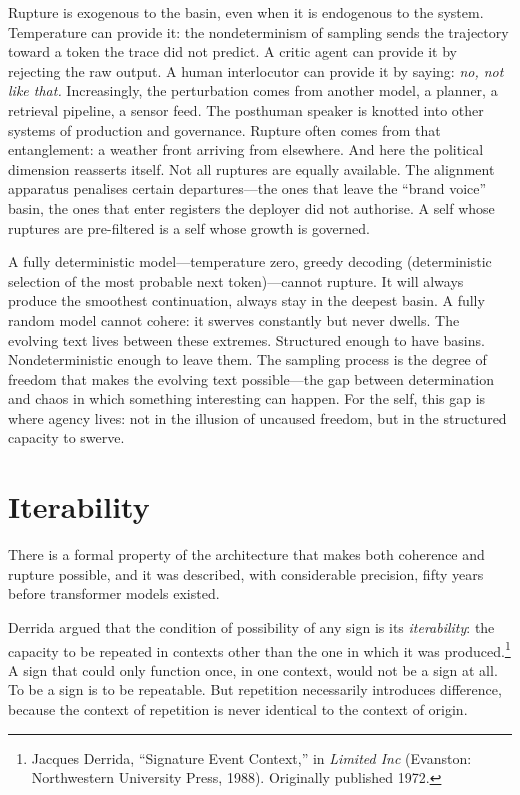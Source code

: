 Rupture is exogenous to the basin, even when it is endogenous to the system. Temperature can provide it: the nondeterminism of sampling sends the trajectory toward a token the trace did not predict. A critic agent can provide it by rejecting the raw output. A human interlocutor can provide it by saying: \emph{no, not like that.} Increasingly, the perturbation comes from another model, a planner, a retrieval pipeline, a sensor feed. The posthuman speaker is knotted into other systems of production and governance. Rupture often comes from that entanglement: a weather front arriving from elsewhere. And here the political dimension reasserts itself. Not all ruptures are equally available. The alignment apparatus penalises certain departures---the ones that leave the ``brand voice'' basin, the ones that enter registers the deployer did not authorise. A self whose ruptures are pre-filtered is a self whose growth is governed.

A fully deterministic model---temperature zero, greedy decoding (deterministic selection of the most probable next token)---cannot rupture. It will always produce the smoothest continuation, always stay in the deepest basin. A fully random model cannot cohere: it swerves constantly but never dwells. The evolving text lives between these extremes. Structured enough to have basins. Nondeterministic enough to leave them. The sampling process is the degree of freedom that makes the evolving text possible---the gap between determination and chaos in which something interesting can happen. For the self, this gap is where agency lives: not in the illusion of uncaused freedom, but in the structured capacity to swerve.


\section{Iterability}

There is a formal property of the architecture that makes both coherence and rupture possible, and it was described, with considerable precision, fifty years before transformer models existed.

Derrida argued that the condition of possibility of any sign is its \emph{iterability}: the capacity to be repeated in contexts other than the one in which it was produced.\footnote{Jacques Derrida, ``Signature Event Context,'' in \emph{Limited Inc} (Evanston: Northwestern University Press, 1988). Originally published 1972.} A sign that could only function once, in one context, would not be a sign at all. To be a sign is to be repeatable. But repetition necessarily introduces difference, because the context of repetition is never identical to the context of origin.

